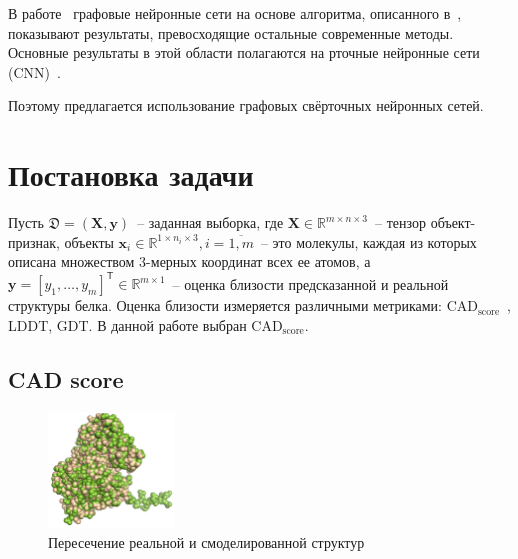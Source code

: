 \documentclass[14pt]{extarticle}
\begin{document}
В работе~\cite{Baldassarre2019GraphQAPM} графовые нейронные сети на основе алгоритма, описанного в~\cite{Battaglia2018RelationalIB}, показывают результаты, превосходящие остальные современные методы. Основные результаты в этой области полагаются на рточные нейронные сети (CNN)~\cite{10.1093/bioinformatics/btz122}. 

Поэтому предлагается использование графовых свёрточных нейронных сетей. 

\section{Постановка задачи}

Пусть $\mathfrak{D} = (\mathbf{X}, \mathbf{y})$~-- заданная выборка, где $\mathbf{X}\in \mathbb{R}^{m\times n\times 3}$~-- тензор объект-признак, объекты $\mathbf{x}_i\in \mathbb{R}^{1\times n_i\times 3}, i=\overline{1,m}$~-- это молекулы, каждая из которых описана множеством 3-мерных координат всех ее атомов, а $\mathbf{y} = [y_1,\dots, y_m]^{\mathsf{T}}\in \mathbb{R}^{m\times 1}$~-- оценка близости предсказанной и реальной структуры белка. Оценка близости измеряется различными метриками: $\text{CAD}_\text{score}$~\cite{Olechnovic2013CADscoreAN}, LDDT, GDT. В данной работе выбран $\text{CAD}_\text{score}$. 

\subsection{CAD score}


\begin{figure}
	\centering
	\includegraphics[width=0.3\textwidth]{T0861_Atome2_CBS_TS4.pdf}
	\caption{Пересечение реальной и смоделированной структур}
	\label{CAD_example}
\end{figure}
\end{document}

